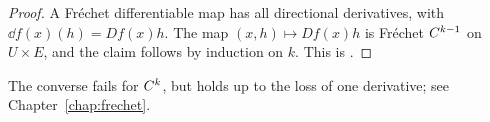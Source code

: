 \begin{proof}
  \leanok
  A Fréchet differentiable map has all directional derivatives, with $\dd f(x)(h) = Df(x)h$.
  The map $(x, h) \mapsto Df(x) h$ is Fréchet $C^{k-1}$ on $U \times E$, and the claim follows by
  induction on $k$. This is \cite[Remark I.2.2]{Nee06}.
\end{proof}

The converse fails for $C^{k}$, but holds up to the loss of one derivative; see
Chapter~\ref{chap:frechet}.
